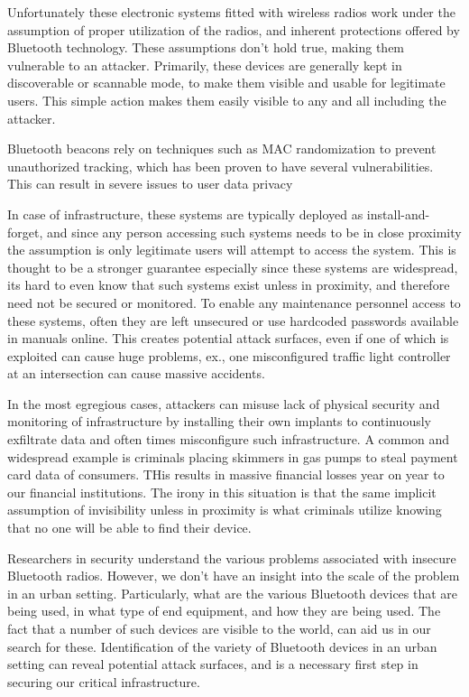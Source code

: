 \begin{dissertationintroduction}
    Unfortunately these electronic systems fitted with wireless radios work under the assumption of proper utilization of the radios, and inherent protections offered by Bluetooth technology. These assumptions don’t hold true, making them vulnerable to an attacker. Primarily, these devices are generally kept in discoverable or scannable mode, to make them visible and usable for legitimate users. This simple action makes them easily visible to any and all including the attacker.
    
    Bluetooth beacons rely on techniques such as MAC randomization to prevent unauthorized tracking, which has been proven to have several vulnerabilities. This can result in severe issues to user data privacy
    
    In case of infrastructure, these systems are typically deployed as install-and-forget, and since any person accessing such systems needs to be in close proximity the assumption is only legitimate users will attempt to access the system. This is thought to be a stronger guarantee especially since these systems are widespread, its hard to even know that such systems exist unless in proximity, and therefore need not be secured or monitored. To enable any maintenance personnel access to these systems, often they are left unsecured or use hardcoded passwords available in manuals online. This creates potential attack surfaces, even if one of which is exploited can cause huge problems, ex., one misconfigured traffic light controller at an intersection can cause massive accidents.
    
    In the most egregious cases, attackers can misuse lack of physical security and monitoring of infrastructure by installing their own implants to continuously exfiltrate data and often times misconfigure such infrastructure. A common and widespread example is criminals placing skimmers in gas pumps to steal payment card data of consumers. THis results in massive financial losses year on year to our financial institutions. The irony in this situation is that the same implicit assumption of invisibility unless in proximity is what criminals utilize knowing that no one will be able to find their device.
    
    Researchers in security understand the various problems associated with insecure Bluetooth radios. However, we don't have an insight into the scale of the problem in an urban setting. Particularly, what are the various Bluetooth devices that are being used, in what type of end equipment, and how they are being used. The fact that a number of such devices are visible to the world, can aid us in our search for these. Identification of the variety of Bluetooth devices in an urban setting can reveal potential attack surfaces, and is a necessary first step in securing our critical infrastructure.
    

\end{dissertationintroduction}
